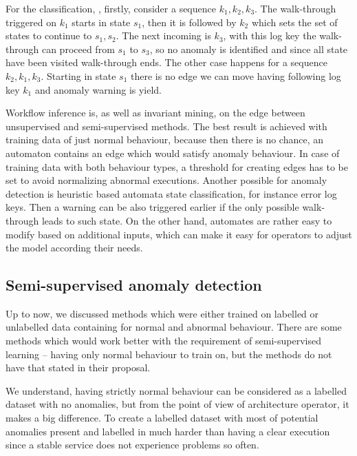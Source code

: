 For the classification, , firstly, consider a sequence $ k_{1}, k_{2}, k_{3} $. The walk-through triggered on $k_{1}$ starts in state $s_{1}$, then it is followed by $k_{2}$ which sets the set of states to continue to ${ s_{1}, s_{2}}$. The next incoming is $k_{3}$, with this log key the walk-through can proceed from $s_{1}$ to $s_{3}$, so no anomaly is identified and since all state have been visited walk-through ends. The other case happens for a sequence $ k_{2}, k_{1}, k_{3} $. Starting in state $s_{1}$ there is no edge we can move having following log key $k_{1}$ and anomaly warning is yield.

Workflow inference is, as well as invariant mining, on the edge between unsupervised and semi-supervised methods. The best result is achieved with training data of just normal behaviour, because then there is no chance, an automaton contains an edge which would satisfy anomaly behaviour. In case of training data with both behaviour types, a threshold for creating edges has to be set to avoid normalizing abnormal executions. Another possible for anomaly detection is heuristic based automata state classification, for instance error log keys. Then a warning can be also triggered earlier if the only possible walk-through leads to such state. On the other hand, automates are rather easy to modify based on additional inputs, which can make it easy for operators to adjust the model according their needs.


\subsection{Semi-supervised anomaly detection}
Up to now, we discussed methods which were either trained on labelled or unlabelled data containing for normal and abnormal behaviour. There are some methods which would work better with the requirement of semi-supervised learning – having only normal behaviour to train on, but the methods do not have that stated in their proposal. 

We understand, having strictly normal behaviour can be considered as a labelled dataset with no anomalies, but from the point of view of architecture operator, it makes a big difference. To create a labelled dataset with most of potential anomalies present and labelled in much harder than having a clear execution since a stable service does not experience problems so often.
